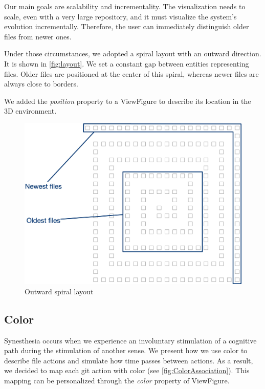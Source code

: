 Our main goals are scalability and incrementality. The visualization needs to scale, even with a very large repository, and it must visualize the system's evolution incrementally. Therefore, the user can immediately distinguish older files from newer ones.

Under those circumstances, we adopted a spiral layout with an outward direction. It is shown in \autoref{fig:layout}. We set a constant gap between entities representing files. 
Older files are positioned at the center of this spiral, whereas newer files are always close to borders. 

We added the \textit{position} property to a ViewFigure to describe its location in the 3D environment. 

\begin{figure}
    \center
    \includegraphics[width=\textwidth]{SpiralLayout.jpg}
    \caption{Outward spiral layout}
    \label{fig:layout}
\end{figure}

\subsection*{Color}

Synesthesia occurs when we experience an involuntary stimulation of a cognitive path during the stimulation of another sense.
We present how we use color to describe file actions and simulate how time passes between actions.
As a result, we decided to map each git action with color (see \autoref{fig:ColorAssociation}). This mapping can be personalized through the \textit{color} property of ViewFigure.

